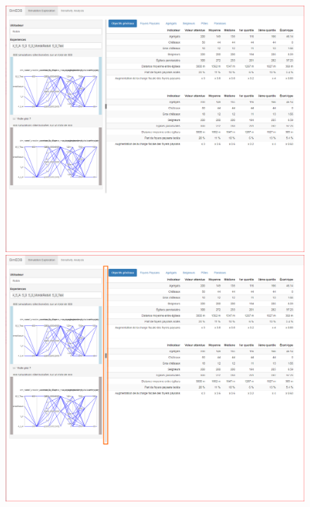 			\begin{figure}[H]
				\hspace*{\fill}%
				\begin{minipage}[t]{.49\linewidth}
					\centering
					\vspace{0pt}
					\includegraphics[width=\linewidth]{img/SimEDB_base.png}
				\end{minipage} \hfill
				\begin{minipage}[t]{.49\linewidth}
					\centering
					\vspace{0pt}
					\includegraphics[width=\linewidth]{img/SimEDB_resize.png}

\end{minipage}
\end{figure}
